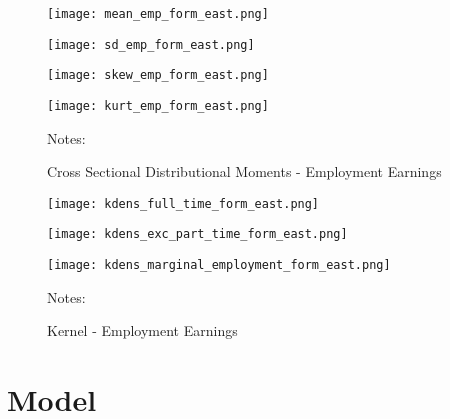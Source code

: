 \documentclass[12pt, a4paper]{article}
\begin{document}
\begin{figure}[!h]
\captionsetup{font=large}
\caption{Cross Sectional Distributional Moments - Employment Earnings}
	\begin{minipage}[b]{0.48\textwidth} 
		\centering
		\texttt{[image: mean\_emp\_form\_east.png]}
		\label{fig:mean_emp_form_east}
	\end{minipage}
	\begin{minipage}[b]{0.48\textwidth}
		\centering
		\texttt{[image: sd\_emp\_form\_east.png]}
		\label{fig:var_emp_form_east}
	\end{minipage}
	\begin{minipage}[b]{0.48\textwidth} 
		\centering
		\texttt{[image: skew\_emp\_form\_east.png]}
		\label{fig:skew_emp_form_east}
	\end{minipage}
	\begin{minipage}[b]{0.48\textwidth}
		\centering
		\texttt{[image: kurt\_emp\_form\_east.png]}
		\label{fig:kurt_emp_form_east}
	\end{minipage}
\footnotesize{
\justifying Notes: \par} 
\end{figure}

\begin{figure}[!h]
\centering
\captionsetup{font=large}
\caption{Kernel - Employment Earnings}
	\begin{minipage}[b]{0.32\textwidth} 
		\centering
		\texttt{[image: kdens\_full\_time\_form\_east.png]}
		\label{fig:kdens_full_time_form_east}
	\end{minipage}
	\begin{minipage}[b]{0.32\textwidth}
		\centering
		\texttt{[image: kdens\_exc\_part\_time\_form\_east.png]}
		\label{fig:kdens_exc_part_time_form_east}
	\end{minipage}
	\begin{minipage}[b]{0.32\textwidth} 
		\centering
		\texttt{[image: kdens\_marginal\_employment\_form\_east.png]}
		\label{fig:kdens_marginal_employment_form_east}
	\end{minipage}
\footnotesize{
\justifying Notes: \par} 
\end{figure}

\section{Model}\label{sec:Model}
\end{document}
